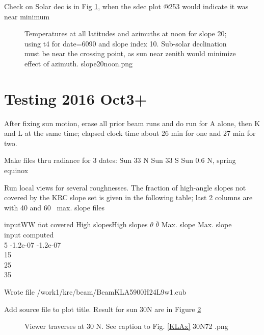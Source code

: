 \documentclass{article}
\begin{document}
Check on Solar dec is in Fig \ref{slope20noon}, when the sdec plot @253 would indicate it was near minimum

\begin{figure}[!ht] 
\caption[slope20noon]{Temperatures at all latitudes and azimuths at noon for
  slope 20\qd; using t4 for date=6090 and slope index 10. Sub-solar declination
  must be near the crossing point, as sun near zenith would minimize effect of
  azimuth.
\label{slope20noon}  slope20noon.png  }
\end{figure} 


 \section{Testing 2016 Oct3+}
After fixing sun motion, erase all prior beam runs and do run for A alone, then
K and L at the same time; elapsed clock time about 26 min for one and 27 min for
two.

Make files thru radiance for 3 dates:
 Sun 33 N
 Sun 33 S
 Sun 0.6 N, spring equinox

 Run local views for several roughnesses. The fraction of high-angle slopes not
 covered by the KRC slope set is given in the following table; last 2 columns are
 with 40 and 60\qd~ max. slope files
\begin{tabbing}
inputWW \= not covered \=  High slopes\= High slopes \kill
$\theta$ \> $\overline{\theta}$ \> Max. slope \>  Max. slope \\
input   \> computed \qd  {}\qd \\
5   \> -1.2e-07 \>  -1.2e-07 \\
15    \\
25      \\
35   \>      \\
\end{tabbing}

 Wrote file /work1/krc/beam/BeamKLA5900H24L9w1.cub

Add source file to plot title. Result for sun 30N are in Figure 
\ref{30N72}
\begin{figure}[!ht] 
\caption[Beam profiles with Sun 30N]{Viewer traverses at 30 N. See caption to Fig. \ref{KLAx}
\label{30N72} 30N72 .png  }
\end{figure} 
\end{document}

